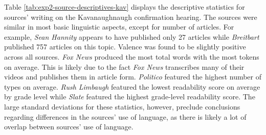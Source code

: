 \documentclass[
  man,floatsintext]{apa6}
\begin{document}
Table \ref{tab:exp2-source-descriptives-kav} displays the descriptive
statistics for sources' writing on the Kavanaughnaugh confirmation
hearing. The sources were similar in most basic linguistic aspects,
except for number of articles. For example, \emph{Sean Hannity} appears to
have published only 27 articles while \emph{Breitbart} published 757 articles
on this topic. Valence was found to be slightly positive across all
sources. \emph{Fox News} produced the most total words with the most tokens
on average. This is likely due to the fact \emph{Fox News} transcribes many
of their videos and publishes them in article form. \emph{Politico} featured
the highest number of types on average. \emph{Rush Limbaugh} featured the
lowest readability score on average by grade level while \emph{Slate}
featured the highest grade-level readability score. The large standard
deviations for these statistics, however, preclude conclusions regarding
differences in the sources' use of language, as there is likely a lot of
overlap between sources' use of language.
\end{document}
